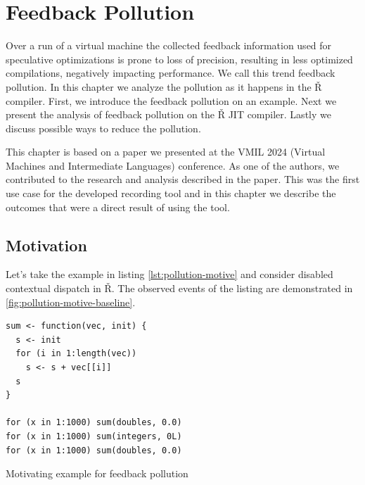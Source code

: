 \chapter{Feedback Pollution}

\begin{chapterabstract}
  Over a run of a virtual machine the collected feedback information used for speculative optimizations is prone to loss of precision, resulting in less optimized compilations, negatively impacting performance. We call this trend feedback pollution. In this chapter we analyze the pollution as it happens in the Ř compiler. First, we introduce the feedback pollution on an example. Next we present the analysis of feedback pollution on the Ř JIT compiler. Lastly we discuss possible ways to reduce the pollution.
\end{chapterabstract}

This chapter is based on a paper we presented at the VMIL 2024 (Virtual Machines and Intermediate Languages) conference\cite{feedback-vmil}. As one of the authors, we contributed to the research and analysis described in the paper. This was the first use case for the developed recording tool and in this chapter we describe the outcomes that were a direct result of using the tool.

\section{Motivation}

Let's take the example in listing \ref{lst:pollution-motive} and consider disabled contextual dispatch in Ř. The observed events of the listing are demonstrated in \ref{fig:pollution-motive-baseline}.

\begin{listing}
	\begin{verbatim}
sum <- function(vec, init) {
  s <- init
  for (i in 1:length(vec))
    s <- s + vec[[i]]
  s
}

for (x in 1:1000) sum(doubles, 0.0)
for (x in 1:1000) sum(integers, 0L)
for (x in 1:1000) sum(doubles, 0.0)
  \end{verbatim}
	\caption{Motivating example for feedback pollution}\label{lst:pollution-motive}
\end{listing}


